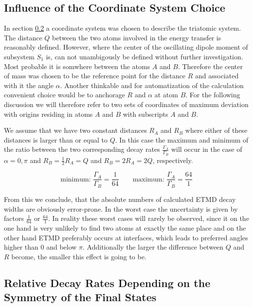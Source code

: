 \subsection{Influence of the Coordinate System Choice}
In section \ref{} a coordinate system was chosen to describe the
triatomic system. The distance $Q$ between the two atoms involved
in the energy transfer is reasonably defined. However, where the
center of the oscillating dipole moment of subsystem $S_1$ is, can
not unambigously be defined without further investigation. Most
probable it is somwhere between the atoms $A$ and $B$. Therefore
the center of mass was chosen to be the reference point for the
distance $R$ and associated with it the angle $\alpha$.
Another thinkable and for automatization of the calculation
convenient choice would be to anchorage $R$ and $\alpha$ at
atom $B$.
For the following discussion we will therefore refer to two sets
of coordinates of maximum deviation with origins residing in atoms
$A$ and $B$ with subscripts $A$ and $B$.

We assume that we have two constant distances $R_{A}$ and $R_B$
where either of these distances is larger than or equal to $Q$.
In this case the maximum and minimum of the ratio between the two
corresponding decay rates $\frac{\Gamma_{A}}{\Gamma_B}$ will occur
in the case of $\alpha = 0,\pi$ and $R_B = \frac 12 R_{A} = Q$
and $R_B = 2 R_{A} = 2Q$, respectively.

\begin{figure}[h]
 \centering
 
 \caption{}
 \label{}
\end{figure}

\begin{equation}
\text{minimum: } \frac{\Gamma_{A}}{\Gamma_B}= \frac{1}{64} \quad\quad
\text{maximum: } \frac{\Gamma_{A}}{\Gamma_B}= \frac{64}{1}
\end{equation}

From this we conclude, that the absolute numbers of calculated ETMD
decay widths are obviously error-prone. In the worst case the uncertainty
is given by factors $\frac{1}{64}$ or $\frac{64}{1}$.
In reality these worst cases will rarely be observed, since it on
the one hand is very unlikely to find two atoms at exactly the same place
and on the other hand ETMD preferably occurs at interfaces, which leads
to preferred angles higher than 0 and below $\pi$.
Additionally the larger the difference between $Q$ and $R$ become, the
smaller this effect is going to be.


\subsection{Relative Decay Rates Depending on the Symmetry of the Final States}
